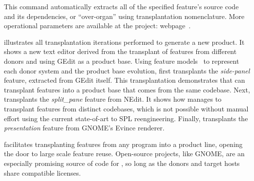 %

This command automatically extracts all of the specified feature's source code and its dependencies, or “over-organ” using transplantation nomenclature. More operational parameters are available at the project: webpage~\cite{ProjectWebpage}.

 illustrates all transplantation iterations performed to generate a new product.  It shows a new text editor derived from the transplant of features from different donors and using GEdit as a product base. Using feature models~\cite{Kang1990} to represent each donor system and the product base evolution, \prodscalpel first transplants the \emph{side-panel} feature, extracted from GEdit itself. This transplantation demonstrates that \prodscalpel can transplant features into a product base that comes from the same codebase.  Next, \prodscalpel transplants the \emph{split\_pane} feature from NEdit. It shows how \prodscalpel manages to transplant features from distinct codebases, which is not possible without manual effort using the current state-of-art to SPL reengineering. Finally, \prodscalpel transplants the \emph{presentation} feature from GNOME's Evince renderer. 

\FOUNDRY facilitates transplanting features from any program into a product line, opening the door to large scale feature reuse. Open-source projects, like GNOME, are an especially promising source of code for \FOUNDRY, so long as the donors and target hosts share compatible licenses.

